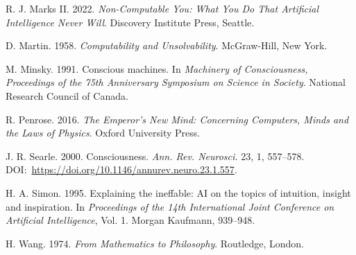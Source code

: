 \begin{thebibliography}{}
 R. J. Marks II. 2022. \textit{Non-Computable You: What You Do That Artificial Intelligence Never Will}. Discovery Institute Press, Seattle.

 D. Martin. 1958. \textit{Computability and Unsolvability}. McGraw-Hill, New York.

 M. Minsky. 1991. Conscious machines. In \textit{Machinery of Consciousness, Proceedings of the 75th Anniversary Symposium on Science in Society}. National Research Council of Canada.

 R. Penrose. 2016. \textit{The Emperor's New Mind: Concerning Computers, Minds and the Laws of Physics}. Oxford University Press.

 J. R. Searle. 2000. Consciousness. \textit{Ann. Rev. Neurosci.} 23, 1, 557--578. DOI:~\href{https://doi.org/10.1146/annurev.neuro.23.1.557}{https://{\allowbreak}doi.{\allowbreak}org/{\allowbreak}10.{\allowbreak}1146/{\allowbreak}annurev.{\allowbreak}neuro.{\allowbreak}23.{\allowbreak}1.557}.

 H. A. Simon. 1995. Explaining the ineffable: AI on the topics of intuition, insight and inspiration. In \textit{Proceedings of the 14th International Joint Conference on Artificial Intelligence}, Vol. 1. Morgan Kaufmann, 939--948.

 H. Wang. 1974. \textit{From Mathematics to Philosophy}. Routledge, London.
\end{thebibliography}

%

